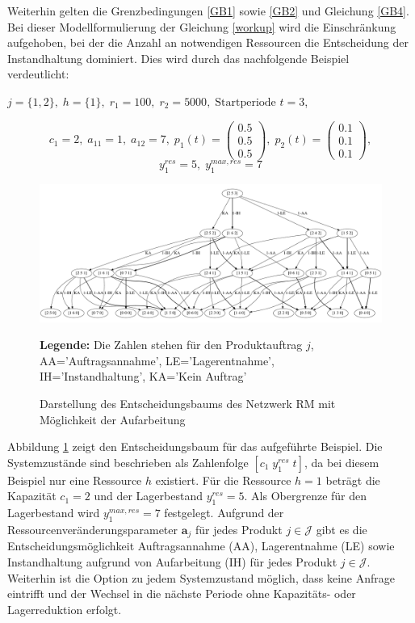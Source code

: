 Weiterhin gelten die Grenzbedingungen \eqref{GB1} sowie \eqref{GB2} und Gleichung \eqref{GB4}. Bei dieser Modellformulierung der Gleichung \eqref{workup} wird die Einschränkung aufgehoben, bei der die Anzahl an notwendigen Ressourcen die Entscheidung der Instandhaltung dominiert. Dies wird durch das nachfolgende Beispiel verdeutlicht:
\begin{center}
$j = \{1, 2\}, \; h = \{1\}, \; r_{1} = 100, \; r_{2} = 5000, \; \text{Startperiode } t=3$,
\end{center}
\[
    c_{1}=2, \;
    a_{11}=1, \;
     a_{12}=7, \;
     p_{1}(t)=\begin{pmatrix} 0.5\\ 0.5\\ 0.5  \end{pmatrix}, \;
     p_{2}(t)=\begin{pmatrix} 0.1\\ 0.1\\ 0.1  \end{pmatrix},
  \]
  \[
    y_{1}^{res}= 5, \;
    y_{1}^{max,res}=7
      \]
\begin{figure}[h!]
  \begin{center}
    \includegraphics[width=130mm]{Bilder/Beispiel5.pdf}
    \caption{Darstellung des Entscheidungsbaums des Netzwerk RM mit Möglichkeit der Aufarbeitung}  \label{B5}
    {\footnotesize \textbf{Legende:} Die Zahlen stehen für den Produktauftrag $j$, AA='Auftragsannahme', LE='Lagerentnahme', IH='Instandhaltung', KA='Kein Auftrag'} 
  \end{center}
\end{figure}

Abbildung \ref{B5} zeigt den Entscheidungsbaum für das aufgeführte Beispiel. Die Systemzustände sind beschrieben als Zahlenfolge $[c_{1}\; y_{1}^{res}\;t]$, da bei diesem Beispiel nur eine Ressource $h$ existiert. Für die Ressource $h=1$ beträgt die Kapazität $c_{1}=2$ und der Lagerbestand $y_{1}^{res}=5$. Als Obergrenze für den Lagerbestand wird $y_{1}^{max,res}=7$ festgelegt. Aufgrund der Ressourcenveränderungsparameter $\textbf{a}_{j}$ für jedes Produkt $j\in\mathcal{J}$ gibt es die Entscheidungsmöglichkeit Auftragsannahme (AA), Lagerentnahme (LE) sowie Instandhaltung aufgrund von Aufarbeitung (IH) für jedes Produkt $j\in\mathcal{J}$. Weiterhin ist die Option zu jedem Systemzustand möglich, dass keine Anfrage eintrifft und der Wechsel in die nächste Periode ohne Kapazitäts- oder Lagerreduktion erfolgt.

